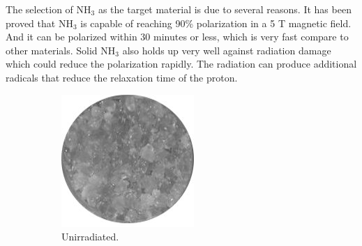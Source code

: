 The selection of NH${}_3$ as the target material is due to several reasons. It has been proved that NH${}_3$ is capable of reaching 90\% polarization in a 5 T magnetic field. And it can be polarized within 30 minutes or less, which is very fast compare to other materials. Solid NH${}_3$ also holds up very well against radiation damage which could reduce the polarization rapidly. The radiation can produce additional radicals that reduce the relaxation time of the proton.

\begin{figure}[tb!]
  \centering
  \begin{subfigure}[t]{0.2\textwidth}
    \includegraphics[width=\textwidth]{figs/ammonia-unirradiated.jpg}
    \caption{Unirradiated. \label{C5S3SS2F3a}}
  \end{subfigure}
  \qquad
  \begin{subfigure}[t]{0.2\textwidth}

\end{subfigure}
\end{figure}
